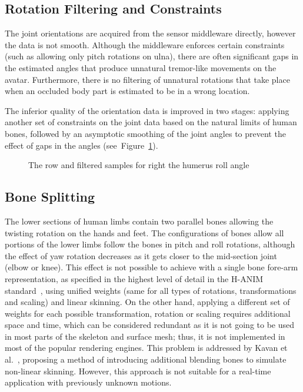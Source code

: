\subsection{Rotation Filtering and Constraints}
The joint orientations are acquired from the sensor middleware directly, however the data is not smooth. Although the middleware enforces certain constraints (such as allowing only pitch rotations on ulna), there are often significant gaps in the estimated angles that produce unnatural tremor-like movements on the avatar. Furthermore, there is no filtering of unnatural rotations that take place when an occluded body part is estimated to be in a wrong location. 

The inferior quality of the orientation data is improved in two stages: applying another set of constraints on the joint data based on the natural limits of human bones, followed by an asymptotic smoothing of the joint angles to prevent the effect of gaps in the angles (see~Figure~\ref{fig:rotation-filter}). 

\begin{figure}[htbp]
	\centerline{ 
	}
\caption{The row and filtered samples for right the humerus roll angle}
	\label{fig:rotation-filter}
\end{figure}


\subsection {Bone Splitting}
\label{subsection_bone_splitting}
The lower sections of human limbs contain two parallel bones allowing the twisting rotation on the hands and feet. The configurations of bones allow all portions of the lower limbs follow the bones in pitch and roll rotations, although the effect of yaw rotation decreases as it gets closer to the mid-section joint (elbow or knee). This effect is not possible to achieve with a single bone fore-arm representation, as specified in the highest level of detail in the H-ANIM standard~\cite{HANIM}, using unified weights (same for all types of rotations, transformations and scaling) and linear skinning. On the other hand, applying a different set of weights for each possible  transformation, rotation or scaling requires additional space and time, which can be considered redundant as it is not going to be used in most parts of the skeleton and surface mesh; thus, it is not implemented in most of the popular rendering engines. This problem is addressed by Kavan et al.~\cite{Kavan2009}, proposing a method of introducing additional blending bones to simulate non-linear skinning. However, this approach is not suitable for a real-time application with previously unknown motions. 

